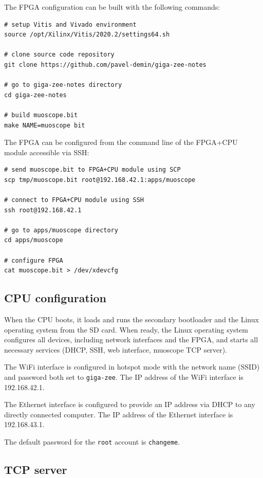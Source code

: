 \documentclass[12pt, a4paper]{article}
\begin{document}
The FPGA configuration can be built with the following commands:
\vspace{-1ex}
\begin{verbatim}
# setup Vitis and Vivado environment
source /opt/Xilinx/Vitis/2020.2/settings64.sh

# clone source code repository
git clone https://github.com/pavel-demin/giga-zee-notes

# go to giga-zee-notes directory
cd giga-zee-notes

# build muoscope.bit
make NAME=muoscope bit
\end{verbatim}

The FPGA can be configured from the command line of the FPGA+CPU module accessible via SSH:
\vspace{-1ex}
\begin{verbatim}
# send muoscope.bit to FPGA+CPU module using SCP
scp tmp/muoscope.bit root@192.168.42.1:apps/muoscope

# connect to FPGA+CPU module using SSH
ssh root@192.168.42.1

# go to apps/muoscope directory
cd apps/muoscope

# configure FPGA
cat muoscope.bit > /dev/xdevcfg
\end{verbatim}

\subsection{CPU configuration}

When the CPU boots, it loads and runs the secondary bootloader and the Linux operating system from the SD card. When ready, the Linux operating system configures all devices, including network interfaces and the FPGA, and starts all necessary services (DHCP, SSH, web interface, muoscope TCP server).

The WiFi interface is configured in hotspot mode with the network name (SSID) and password both set to \texttt{giga-zee}. The IP address of the WiFi interface is 192.168.42.1.

The Ethernet interface is configured to provide an IP address via DHCP to any directly connected computer. The IP address of the Ethernet interface is 192.168.43.1.

The default password for the \texttt{root} account is \texttt{changeme}.

\subsection{TCP server}
\end{document}
